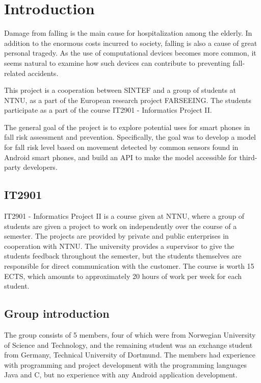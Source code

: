 \chapter{Introduction}

Damage from falling is the main cause for hospitalization among the elderly. In addition to the enormous costs incurred to society, falling is also a cause of great personal tragedy. As the use of computational devices becomes more common, it seems natural to examine how such devices can contribute to preventing fall-related accidents.

This project is a cooperation between SINTEF and a group of students at NTNU, as a part of the European research project FARSEEING. The students participate as a part of the course IT2901 - Informatics Project II.

The general goal of the project is to explore potential uses for smart phones in fall risk assessment and prevention. Specifically, the goal was to develop a model for fall risk level based on movement detected by common sensors found in Android smart phones, and build an API to make the model accessible for third-party developers.



\section{IT2901}
IT2901 - Informatics Project II is a course given at NTNU, where a group of students are given a project to work on independently over the course of a semester. The projects are provided by private and public enterprises in cooperation with NTNU. The university provides a supervisor to give the students feedback throughout the semester, but the students themselves are responsible for direct communication with the customer. The course is worth 15 ECTS, which amounts to approximately 20 hours of work per week for each student. 

\section{Group introduction}
The group consists of 5 members, four of which were from Norwegian University of Science and Technology, and the remaining student was an exchange student from Germany, Technical University of Dortmund. The members had experience with programming and project development with the programming languages Java and C, but no experience with any Android application development. 

